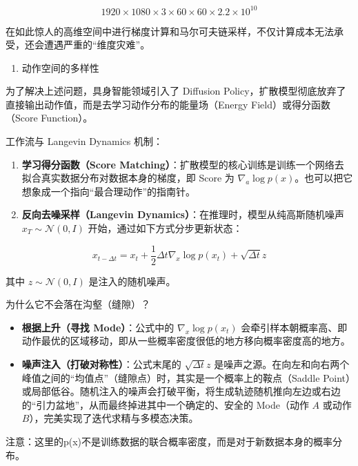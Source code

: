 \[
1920\times1080\times3\times60\times60\times2.2\times10^{10}
\]

在如此惊人的高维空间中进行梯度计算和马尔可夫链采样，不仅计算成本无法承受，还会遭遇严重的``维度灾难''。

\begin{enumerate}
\def\labelenumi{\arabic{enumi}.}
\setcounter{enumi}{1}
\tightlist
\item
  动作空间的多样性
\end{enumerate}

为了解决上述问题，具身智能领域引入了 Diffusion Policy，扩散模型彻底放弃了直接输出动作值，而是去学习动作分布的能量场（Energy Field）或得分函数（Score Function）。

工作流与 Langevin Dynamics 机制：

\begin{enumerate}
\def\labelenumi{\arabic{enumi}.}
\tightlist
\item
  \textbf{学习得分函数（Score Matching）}：扩散模型的核心训练是训练一个网络去拟合真实数据分布对数据本身的梯度，即 Score 为 \(\nabla_a\log p(x)\)。也可以把它想象成一个指向``最合理动作''的指南针。
\item
{}
  \textbf{反向去噪采样（Langevin Dynamics）}：在推理时，模型从纯高斯随机噪声 \(x_T\sim\mathcal{N}(0,I)\) 开始，通过如下方式分步更新状态：
\end{enumerate}

\[
x_{t-\Delta t}=x_t+\frac{1}{2}\Delta t\nabla_x\log p(x_t)+\sqrt{\Delta t}z
\]

其中 \(z\sim\mathcal{N}(0,I)\) 是注入的随机噪声。

为什么它不会落在沟壑（缝隙）？

\begin{itemize}
\tightlist
\item
  \textbf{根据上升（寻找 Mode）}：公式中的 \(\nabla_x\log p(x_t)\) 会牵引样本朝概率高、即动作最优的区域移动，即从一些概率密度很低的地方移向概率密度高的地方。
\item
  \textbf{噪声注入（打破对称性）}：公式末尾的 \(\sqrt{\Delta t}z\) 是噪声之源。在向左和向右两个峰值之间的``均值点''（缝隙点）时，其实是一个概率上的鞍点（Saddle Point）或局部低谷。随机注入的噪声会打破平衡，将生成轨迹随机推向左边或右边的``引力盆地''，从而最终掉进其中一个确定的、安全的 Mode（动作 \(A\) 或动作 \(B\)），完美实现了迭代求精与多模态决策。
\end{itemize}

注意：这里的p(x)不是训练数据的联合概率密度，而是对于新数据本身的概率分布。

